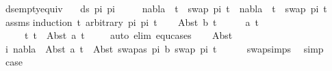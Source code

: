 \begin{isabellebody}
\isanewline
{}\isamarkupfalse%
\ ds{\isacharunderscore}{\kern0pt}empty{\isacharunderscore}{\kern0pt}equiv{\isacharunderscore}{\kern0pt}{}{\isacharcolon}{\kern0pt}\isanewline
\ \ \ {\isachardoublequoteopen}ds\ pi{}\ pi{}\ {\isacharequal}{\kern0pt}\ {\isacharbraceleft}{\kern0pt}{\isacharbraceright}{\kern0pt}{\isachardoublequoteclose}\isanewline
\ \ \ {\isachardoublequoteopen}nabla\ {\isasymturnstile}\ t{}\ {\isasymapprox}\ swap\ pi{}\ t{}\ {\isasymLongrightarrow}\ nabla\ {\isasymturnstile}\ t{}\ {\isasymapprox}\ swap\ pi{}\ t{}{\isachardoublequoteclose}\isanewline
%
\isadelimproof
%
\endisadelimproof
%
\isatagproof
{}\isamarkupfalse%
\ assms\isanewline
{}\isamarkupfalse%
{\isacharparenleft}{\kern0pt}induction\ t{}\ arbitrary{\isacharcolon}{\kern0pt}\ pi{}\ pi{}\ t{}{\isacharparenright}{\kern0pt}\isanewline
\ \ \isamarkupfalse%
\ {\isacharparenleft}{\kern0pt}Abst\ b\ t{}{\isacharprime}{\kern0pt}{\isacharparenright}{\kern0pt}\isanewline
\ \ \isamarkupfalse%
\ \isamarkupfalse%
\ a\ t{}{\isacharprime}{\kern0pt}\isanewline
\ \ \ \ \ t{}{\isacharcolon}{\kern0pt}\ {\isachardoublequoteopen}t{}\ {\isacharequal}{\kern0pt}\ Abst\ a\ t{}{\isacharprime}{\kern0pt}{\isachardoublequoteclose}\isanewline
\ \ \ \ \isamarkupfalse%
{\isacharparenleft}{\kern0pt}auto\ elim{\isacharcolon}{\kern0pt}\ equ{\isachardot}{\kern0pt}cases{\isacharparenright}{\kern0pt}\isanewline
\ \ \isamarkupfalse%
\ Abst\ \isamarkupfalse%
\ i{\isacharcolon}{\kern0pt}\ {\isachardoublequoteopen}nabla\ {\isasymturnstile}\ Abst\ a\ t{}{\isacharprime}{\kern0pt}\ {\isasymapprox}\ Abst\ {\isacharparenleft}{\kern0pt}swapas\ pi{}\ b{\isacharparenright}{\kern0pt}\ {\isacharparenleft}{\kern0pt}swap\ pi{}\ t{}{\isacharprime}{\kern0pt}{\isacharparenright}{\kern0pt}{\isachardoublequoteclose}\isanewline
\ \ \ \ \isamarkupfalse%
\ swap{\isachardot}{\kern0pt}simps{\isacharparenleft}{\kern0pt}{}{\isacharparenright}{\kern0pt}\ \isamarkupfalse%
\ simp\isanewline
\ \ \isamarkupfalse%
\ \isamarkupfalse%
\ {\isacharquery}{\kern0pt}case\isanewline

\end{isabellebody}
